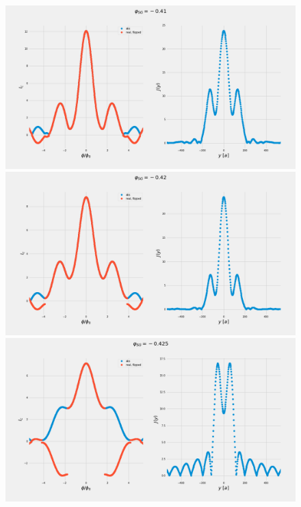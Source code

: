\documentclass[a4paper]{article}
\begin{document}
\begin{figure}
\includegraphics[width=\textwidth]{figs/wg32double/current_and_density_041}
\includegraphics[width=\textwidth]{figs/wg32double/current_and_density_042}
\includegraphics[width=\textwidth]{figs/wg32double/current_and_density_0425}
\end{figure}
\end{document}
